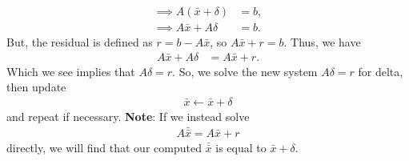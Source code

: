 \documentclass{report}
\begin{document}
\begin{itemize}
\begin{align*}
                \implies A(\bar{x} + \delta ) &= b, \\
                \implies A\bar{x} + A\delta &= b
            .\end{align*}
            But, the residual is defined as $r = b - A\bar{x}$, so $A\bar{x} + r =b$. Thus, we have
            \begin{align*}
                A\bar{x} + A\delta &= A\bar{x} + r
            .\end{align*}
            Which we see implies that $A\delta = r $. So, we solve the new system $A\delta = r$ for delta, then update
            \begin{align*}
                \bar{x} \leftarrow \bar{x}  + \delta
            \end{align*}
            and repeat if necessary. 
            \bigbreak \noindent 
            \textbf{Note}: If we instead solve
            \begin{align*}
                A\bar{\bar{x}} = A\bar{x} + r
            \end{align*}
            directly, we will find that our computed $\bar{\bar{x}}$ is equal to $\bar{x} + \delta$.



    \end{itemize}
\end{document}
